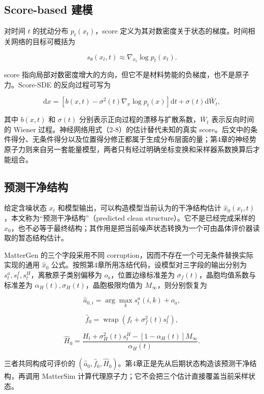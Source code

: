 \subsection{Score-based 建模}

对时间 \(t\) 的扰动分布 \(p_t(x_t)\)，score 定义为其对数密度关于状态的梯度。时间相关网络的目标可概括为

\[
s_\theta(x_t,t)\approx\nabla_{x_t}\log p_t(x_t).
\tag{2-8}
\]

score 指向局部对数密度增大的方向，但它不是材料势能的负梯度，也不是原子力。Score-SDE 的反向过程可写为

\[
\mathrm d x
=\left[b(x,t)-\sigma^2(t)\nabla_x\log p_t(x)\right]\mathrm dt
+\sigma(t)\mathrm d\bar W_t,
\tag{2-9}
\]

其中 \(b(x,t)\) 和 \(\sigma(t)\) 分别表示正向过程的漂移与扩散系数，\(\bar W_t\) 表示反向时间的 Wiener 过程\citep{song2021}。神经网络用式（2-8）的估计替代未知的真实 score。后文中的条件得分、无条件得分以及位置得分修正都属于生成分布层面的量；第4章的神经势原子力则来自另一套能量模型，两者只有经过明确坐标变换和采样器系数换算后才能组合。

\subsection{预测干净结构}

给定含噪状态 \(x_t\) 和模型输出，可以构造模型当前认为的干净结构估计 \(\hat{x}_0(x_t,t)\)，本文称为``预测干净结构''（predicted clean structure）。它不是已经完成采样的 \(x_0\)，也不必等于最终结构；其作用是把当前噪声状态转换为一个可由晶体评价器读取的暂态结构估计。

MatterGen 的三个字段采用不同 corruption，因而不存在一个可无条件替换实际实现的通用 \(\hat{x}_0\) 公式。按照第4章所用冻结代码，设模型对三字段的输出分别为 \(s_t^a,s_t^f,s_t^H\)，离散原子类别偏移为 \(o_a\)，位置边缘标准差为 \(\sigma_f(t)\)，晶胞均值系数与标准差为 \(\alpha_H(t),\sigma_H(t)\)，晶胞极限均值为 \(M_\infty\)，则分别恢复为

\[
\hat a_{0,i}=\arg\max_k s_t^a(i,k)+o_a,
\tag{2-10}
\]

\[
\hat f_0=\operatorname{wrap}\!\left(f_t+\sigma_f^2(t)s_t^f\right),
\tag{2-11}
\]

\[
\hat H_0=
\frac{H_t+\sigma_H^2(t)s_t^H-[1-\alpha_H(t)]M_\infty}
{\alpha_H(t)}.
\tag{2-12}
\]

三者共同构成可评价的 \((\hat a_0,\hat f_0,\hat H_0)\)。第4章正是先从后期状态构造该预测干净结构，再调用 Matter\allowbreak Sim 计算代理原子力；它不会把三个估计直接覆盖当前采样状态。


